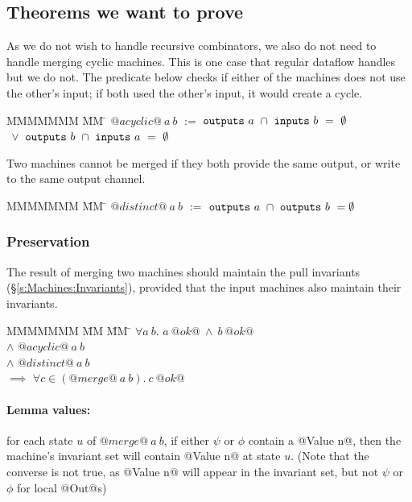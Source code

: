 \subsection{Theorems we want to prove}

As we do not wish to handle recursive combinators, we also do not need to handle merging cyclic machines.
This is one case that regular dataflow handles but we do not.
The predicate below checks if either of the machines does not use the other's input; if both used the other's input, it would create a cycle.

\begin{tabbing}
MMMMMMM \= MM \= \kill
$@acyclic@~a~b$
\> $:=$
\> $\mathtt{outputs}~a~\cap~\mathtt{inputs}~b~=~\emptyset$
\\
\> $~\vee$ \> $\mathtt{outputs}~b~\cap~\mathtt{inputs}~a~=~\emptyset$
\end{tabbing}

Two machines cannot be merged if they both provide the same output, or write to the same output channel.

\begin{tabbing}
MMMMMMM \= MM \= \kill
$@distinct@~a~b$
\> $:=$
\> $\mathtt{outputs}~a~\cap~\mathtt{outputs}~b~=\emptyset$
\end{tabbing}

\subsubsection{Preservation}
The result of merging two machines should maintain the pull invariants (\S\ref{s:Machines:Invariants}), provided that the input machines also maintain their invariants.

\begin{tabbing}
MMMMMMM \= MM \= MM \= \kill
$\forall a~b.$
\>
\> $a~@ok@~\wedge~b~@ok@$
\\
\> $\wedge$
\> $@acyclic@~a~b$
\\
\> $\wedge$
\> $@distinct@~a~b$
\\
\> $\implies$
\> $\forall c \in (@merge@~a~b).\ c~@ok@$
\end{tabbing}

\paragraph{Lemma values:} 
for each state $u$ of $@merge@~a~b$, if either $\psi$ or $\phi$ contain a @Value n@, then the machine's invariant set will contain @Value n@ at state $u$.
(Note that the converse is not true, as @Value n@ will appear in the invariant set, but not $\psi$ or $\phi$ for local @Out@s)

